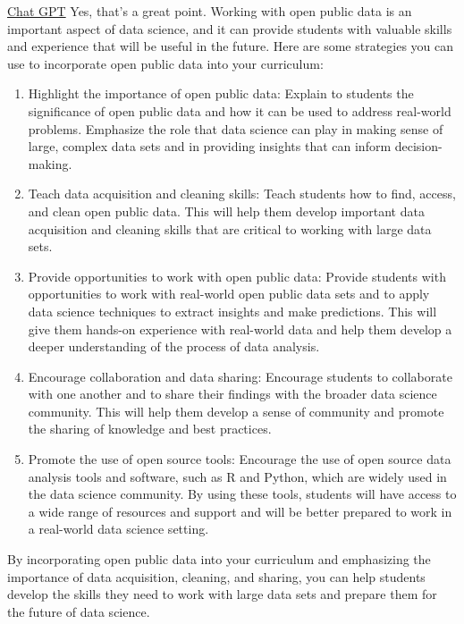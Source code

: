 \documentclass[
]{bxjsbook}
\providecommand{\tightlist}{%
  \setlength{\itemsep}{0pt}\setlength{\parskip}{0pt}}
\theoremstyle{definition}
\theoremstyle{definition}
\theoremstyle{definition}
\theoremstyle{definition}
\theoremstyle{remark}
\begin{document}
\protect\hyperlink{chatgpt}{Chat GPT} Yes, that's a great point. Working with open public data is an important aspect of data science, and it can provide students with valuable skills and experience that will be useful in the future. Here are some strategies you can use to incorporate open public data into your curriculum:

\begin{enumerate}
\def\labelenumi{\arabic{enumi}.}
\tightlist
\item
  Highlight the importance of open public data: Explain to students the significance of open public data and how it can be used to address real-world problems. Emphasize the role that data science can play in making sense of large, complex data sets and in providing insights that can inform decision-making.
\item
  Teach data acquisition and cleaning skills: Teach students how to find, access, and clean open public data. This will help them develop important data acquisition and cleaning skills that are critical to working with large data sets.
\item
  Provide opportunities to work with open public data: Provide students with opportunities to work with real-world open public data sets and to apply data science techniques to extract insights and make predictions. This will give them hands-on experience with real-world data and help them develop a deeper understanding of the process of data analysis.
\item
  Encourage collaboration and data sharing: Encourage students to collaborate with one another and to share their findings with the broader data science community. This will help them develop a sense of community and promote the sharing of knowledge and best practices.
\item
  Promote the use of open source tools: Encourage the use of open source data analysis tools and software, such as R and Python, which are widely used in the data science community. By using these tools, students will have access to a wide range of resources and support and will be better prepared to work in a real-world data science setting.
\end{enumerate}

By incorporating open public data into your curriculum and emphasizing the importance of data acquisition, cleaning, and sharing, you can help students develop the skills they need to work with large data sets and prepare them for the future of data science.
\end{document}
